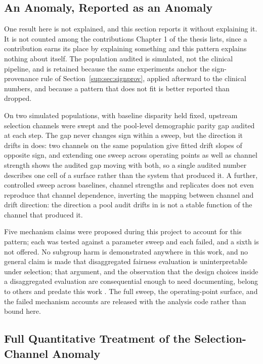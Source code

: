 \subsection{An Anomaly, Reported as an Anomaly}
\label{sup:sec:disc-anomaly}

One result here is not explained, and this section reports it without
explaining it. It is not counted among the contributions Chapter 1 of the thesis lists, since a contribution earns its place by explaining something
and this pattern explains nothing about itself. The population audited is
simulated, not the clinical pipeline, and is retained because the same
experiments anchor the sign-provenance rule of Section~\ref{sup:sec:signprov},
applied afterward to the clinical numbers, and because a pattern that does
not fit is better reported than dropped.

On two simulated populations, with baseline disparity held fixed, upstream
selection channels were swept and the pool-level demographic parity gap
audited at each step. The gap never changes sign within a sweep, but the
direction it drifts in does: two channels on the same population give fitted
drift slopes of opposite sign, and extending one sweep across operating
points as well as channel strength shows the audited gap moving with both,
so a single audited number describes one cell of a surface rather than the
system that produced it. A further, controlled sweep across baselines,
channel strengths and replicates does not even reproduce that channel
dependence, inverting the mapping between channel and drift direction: the
direction a pool audit drifts in is not a stable function of the channel
that produced it.

Five mechanism claims were proposed during this project to account for this
pattern; each was tested against a parameter sweep and each failed, and a
sixth is not offered. No subgroup harm is demonstrated anywhere in this work,
and no general claim is made that disaggregated fairness evaluation is
uninterpretable under selection; that argument, and the observation that the
design choices inside a disaggregated evaluation are consequential enough to
need documenting, belong to others and predate this work
\citep{pfohl2025disaggregated,fogliato2020fairness,barocas2021disaggregated}.
The full sweep, the operating-point surface, and the failed mechanism
accounts are released with the analysis code rather than bound here.



\subsection{Full Quantitative Treatment of the Selection-Channel Anomaly}

